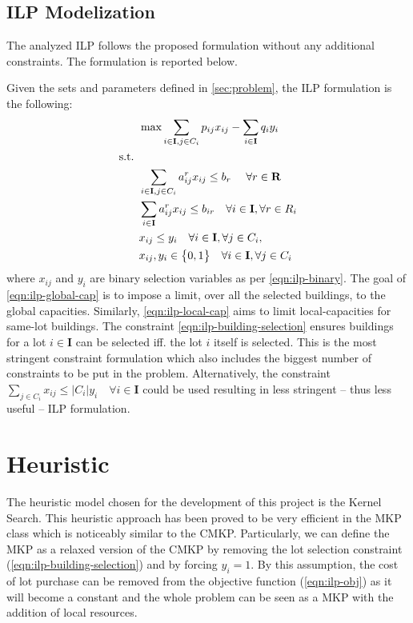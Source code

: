 \documentclass[a4paper, twocolumn, oneside]{article}
\begin{document}
\subsection{ILP Modelization}
The analyzed \ac{ILP} follows the proposed formulation\cite{assignment} without any additional constraints. The formulation is reported below.

Given the sets and parameters defined in \cref{sec:problem}, the \ac{ILP} formulation is the following:
\begin{align}
	&\max \sum_{i \in \mathbf{I}, j \in C_i} p_{ij}x_{ij} - \sum_{i\in\mathbf{I}} q_{i}y_i \label{eqn:ilp-obj}\\
	\omit s.t. \notag & \\
	&\sum_{i \in \mathbf{I}, j \in C_i} a^r_{ij}x_{ij} \leq b_r \ \quad \forall r \in \mathbf{R} \label{eqn:ilp-global-cap}\\
	&\sum_{i \in \mathbf{I}} a^r_{ij}x_{ij} \leq b_{ir} \quad  \forall i \in \mathbf{I}, \forall r \in R_i \label{eqn:ilp-local-cap} \\
	&x_{ij} \leq y_i \quad \forall i \in \mathbf{I}, \forall j \in C_i, \label{eqn:ilp-building-selection}\\
	&x_{ij}, y_i \in \big\{0, 1\big\} \quad \forall i \in \mathbf{I}, \forall j \in C_i \label{eqn:ilp-binary}
\end{align}
where \(x_{ij}\) and \(y_i\) are binary selection variables as per \cref{eqn:ilp-binary}.
The goal of \cref{eqn:ilp-global-cap} is to impose a limit, over all the selected buildings, to the global capacities. Similarly, \cref{eqn:ilp-local-cap} aims to limit local-capacities for same-lot buildings.
The constraint \cref{eqn:ilp-building-selection} ensures buildings for a lot \(i \in \mathbf{I}\) can be selected iff. the lot \(i\) itself is selected.
This is the most stringent constraint formulation which also includes the biggest number of constraints to be put in the problem. Alternatively, the constraint \(\sum_{j \in C_i} x_{ij} \leq |C_i|y_i \quad \forall i \in \mathbf{I}\) could be used resulting in less stringent -- thus less useful -- \ac{ILP} formulation.

\section{Heuristic}\label{sec:heuristic}
The heuristic model chosen for the development of this project is the Kernel Search\cite{angelelli2010kernel}. This heuristic approach has been proved to be very efficient in the \ac{MKP} class which is noticeably similar to the \ac{CMKP}. Particularly, we can define the \ac{MKP} as a relaxed version of the \ac{CMKP} by removing the lot selection constraint (\cref{eqn:ilp-building-selection}) and by forcing \(y_i = 1\). By this assumption, the cost of lot purchase can be removed from the objective function (\cref{eqn:ilp-obj}) as it will become a constant and the whole problem can be seen as a \ac{MKP} with the addition of local resources.
\end{document}

